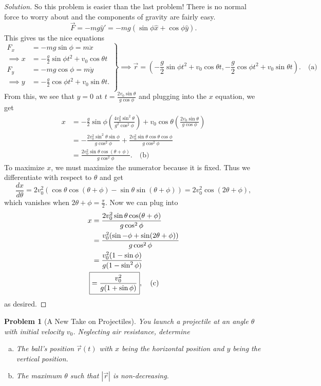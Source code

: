 \documentclass{article}
\theoremstyle{norm}
\newtheorem{prb}[thm]{Problem}
\begin{document}
\begin{proof}[Solution]
So this problem is easier than the last problem! There is no normal
force to worry about and the components of gravity are fairly easy.
\[ \vec{F} = -mg \hat{y}' = -mg (\sin \phi \hat{x} + \cos \phi \hat{y}).
\]
This gives us the nice equations
\[ \left.\begin{aligned}
F_x &= -mg \sin \phi = m \ddot{x} \\
\implies x &= -\frac{g}{2} \sin \phi t^2 + v_0 \cos \theta t \\
F_y &= -mg \cos \phi = m \ddot{y} \\
\implies y &= -\frac{g}{2} \cos \phi t^2 + v_0 \sin \theta t. \\
\end{aligned} \right \rbrace
\implies
\boxed{\vec{r} = \left(-\frac{g}{2} \sin \phi t^2 + v_0 \cos \theta t,
-\frac{g}{2} \cos \phi t^2 + v_0 \sin \theta t\right)}. \quad
\textrm{(a)} \]
From this, we see that $y = 0$ at $t = \frac{2 v_0 \sin \theta}{g \cos
\phi}$ and plugging into the $x$ equation, we get
\[ \begin{aligned}
x &= -\frac{g}{2} \sin \phi \left(\frac{4 v_0^2 \sin^2 \theta}{g^2
\cos^2 \phi}\right) + v_0 \cos \theta \left(\frac{2 v_0 \sin \theta}{g
\cos \phi}\right) \\
&= -\frac{2 v_0^2 \sin^2 \theta \sin \phi}{g \cos^2 \phi} + \frac{2
v_0^2 \sin \theta \cos \theta \cos \phi}{g \cos^2 \phi} \\
&= \boxed{\frac{2 v_0^2 \sin \theta \cos(\theta + \phi)}{g \cos^2
\phi}}. \quad \textrm{(b)}
\end{aligned} \]
To maximize $x$, we must maximize the numerator because it is fixed.
Thus we differentiate with respect to $\theta$ and get
\[ \frac{dx}{d \theta} = 2 v_0^2 (\cos \theta \cos(\theta + \phi) - \sin
\theta \sin(\theta + \phi)) = 2 v_0^2 \cos (2 \theta + \phi), \]
which vanishes when $2 \theta + \phi = \frac{\pi}{2}$. Now we
can plug into
\[ \begin{aligned}
x &= \frac{2 v_0^2 \sin \theta \cos(\theta + \phi)}{g \cos^2 \phi} \\
&= \frac{v_0^2 (\sin -\phi + \sin(2 \theta + \phi))}{g \cos^2 \phi} \\
&= \frac{v_0^2 (1 - \sin \phi)}{g (1 - \sin^2 \phi)} \\
\Aboxed{ &= \frac{v_0^2}{g (1 + \sin \phi)}}, \quad \textrm{(c)} \\
\end{aligned} \]
as desired.
\end{proof}

\begin{prb}[A New Take on Projectiles]
You launch a projectile at an angle $\theta$ with initial velocity
$v_0$. Neglecting air resistance, determine
\begin{enumerate}[(a)]
\item The ball's position $\vec{r}(t)$ with $x$ being the horizontal
position and $y$ being the vertical position.
\item The maximum $\theta$ such that $|\vec{r}|$ is non-decreasing.
\end{enumerate}
\end{prb}
\end{document}
